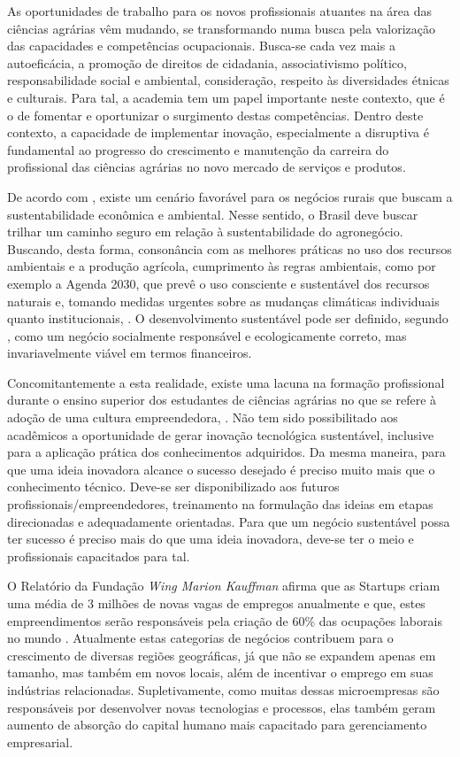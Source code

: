 As oportunidades de trabalho para os novos profissionais atuantes na área das ciências agrárias vêm mudando, se transformando numa busca pela valorização das capacidades e competências ocupacionais. Busca-se cada vez mais a autoeficácia, a promoção de direitos de cidadania, associativismo político, responsabilidade social e ambiental, consideração, respeito às diversidades étnicas e culturais. Para tal, a academia tem um papel importante neste contexto, que é o de fomentar e oportunizar o surgimento destas competências. Dentro deste contexto, a capacidade de implementar inovação, especialmente a disruptiva é fundamental ao progresso do crescimento e manutenção da carreira do profissional das ciências agrárias no novo mercado de serviços e produtos. 


De acordo com , existe um cenário favorável para os negócios rurais que buscam a sustentabilidade econômica e ambiental. Nesse sentido, o Brasil deve buscar trilhar um caminho seguro em relação à sustentabilidade do agronegócio. Buscando, desta forma, consonância com as melhores práticas no uso dos recursos ambientais e a produção agrícola, cumprimento às regras ambientais, como por exemplo a Agenda 2030, que prevê o uso consciente e sustentável dos recursos naturais e, tomando medidas urgentes sobre as mudanças climáticas individuais quanto institucionais, \cite{filho_documentos_2017}. O desenvolvimento sustentável pode ser definido, segundo \cite{lara_ideologia_2017}, como um negócio socialmente responsável e ecologicamente correto, mas invariavelmente viável em termos financeiros.


Concomitantemente a esta realidade, existe uma lacuna na formação profissional durante o ensino superior dos estudantes de ciências agrárias no que se refere à adoção de uma cultura empreendedora, \cite{araujo_educacao_2019}. Não tem sido possibilitado aos acadêmicos a oportunidade de gerar inovação tecnológica sustentável, inclusive para a aplicação prática dos conhecimentos adquiridos. Da mesma maneira, para que uma ideia inovadora alcance o sucesso desejado é preciso muito mais que o conhecimento técnico. Deve-se ser disponibilizado aos futuros profissionais/empreendedores, treinamento na formulação das ideias em etapas direcionadas e adequadamente orientadas. Para que um negócio sustentável possa ter sucesso é preciso mais do que uma ideia inovadora, deve-se ter o meio e profissionais capacitados para tal. 


O Relatório da Fundação \textit{Wing Marion Kauffman} afirma que as Startups criam uma média de 3 milhões de novas vagas de empregos anualmente e que, estes empreendimentos serão responsáveis pela criação de 60\% das ocupações laborais no mundo \cite{brasil_o_2017}. Atualmente estas categorias de negócios contribuem para o crescimento de diversas regiões geográficas, já que não se expandem apenas em tamanho, mas também em novos locais, além de incentivar o emprego em suas indústrias relacionadas. Supletivamente, como muitas dessas microempresas são responsáveis por desenvolver novas tecnologias e processos, elas também geram aumento de absorção do capital humano mais capacitado para gerenciamento empresarial.


